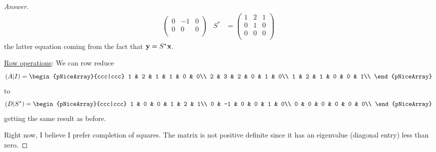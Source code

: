 \documentclass[../psets.tex]{subfiles}
\begin{document}
\begin{enumerate}[label={\textbf{2.\arabic*.}}]
\begin{proof}[Answer]
\begin{align*}
\begin{pmatrix}
                0 & -1 & 0\\
                0 & 0 & 0\\
            \end{pmatrix}&
            S^* &=
            \begin{pmatrix}
                1 & 2 & 1\\
                0 & 1 & 0\\
                0 & 0 & 0\\
            \end{pmatrix}
        \end{align*}
        the latter equation coming from the fact that $\mathbf{y}=S^*\mathbf{x}$.\par
        \underline{Row operations}: We can row reduce
        \begin{equation*}
            (A|I) =
            \begin{pNiceArray}{ccc|ccc}
                1 & 2 & 1 & 1 & 0 & 0\\
                2 & 3 & 2 & 0 & 1 & 0\\
                1 & 2 & 1 & 0 & 0 & 1\\
            \end{pNiceArray}
        \end{equation*}
        to
        \begin{equation*}
            (D|S^*) =
            \begin{pNiceArray}{ccc|ccc}
                1 & 0  & 0 & 1 & 2 & 1\\
                0 & -1 & 0 & 0 & 1 & 0\\
                0 & 0  & 0 & 0 & 0 & 0\\
            \end{pNiceArray}
        \end{equation*}
        getting the same result as before.\par
        Right now, I believe I prefer completion of squares. The matrix is not positive definite since it has an eigenvalue (diagonal entry) less than zero.
    \end{proof}
\end{enumerate}
\end{document}
